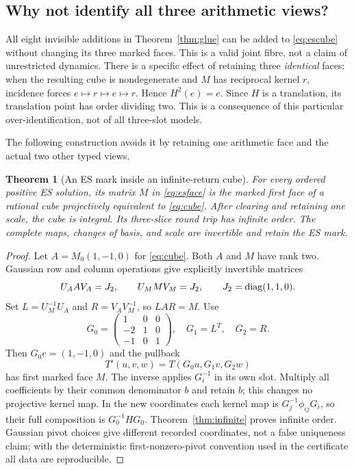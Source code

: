 \documentclass[11pt,reqno]{amsart}
\newtheorem{theorem}{Theorem}[section]
\theoremstyle{definition}\newtheorem{definition}[theorem]{Definition}
\theoremstyle{remark}\newtheorem{remark}[theorem]{Remark}
\begin{document}
\subsection{Why not identify all three arithmetic views?}
All eight invisible additions in Theorem~\ref{thm:glue} can be added to
\eqref{eq:escube} without changing its three marked faces. This is a valid
joint fibre, not a claim of unrestricted dynamics. There is a specific effect
of retaining three \emph{identical} faces: when the resulting cube is
nondegenerate and $M$ has reciprocal kernel $r$, incidence forces
$e\mapsto r\mapsto e\mapsto r$. Hence $H^2(e)=e$. Since $H$ is a translation,
its translation point has order dividing two. This is a consequence of this
particular over-identification, not of all three-slot models.

The following construction avoids it by retaining one arithmetic face and the
actual two other typed views.

\begin{theorem}[An ES mark inside an infinite-return cube]\label{thm:attachment}
For every ordered positive ES solution, its matrix $M$ in \eqref{eq:esface}
is the marked first face of a rational cube projectively equivalent to
\eqref{eq:cube}. After clearing and retaining one scale, the cube is integral.
Its three-slice round trip has infinite order. The complete maps, changes of
basis, and scale are invertible and retain the ES mark.
\end{theorem}
\begin{proof}
Let $A=M_0(1,-1,0)$ for \eqref{eq:cube}. Both $A$ and $M$ have rank two.
Gaussian row and column operations give explicitly invertible matrices
\[
 U_AAV_A=J_2,\qquad U_MMV_M=J_2,\qquad J_2=\operatorname{diag}(1,1,0).
\]
Set $L=U_M^{-1}U_A$ and $R=V_AV_M^{-1}$, so $LAR=M$.
Use
\[
 G_0=\begin{pmatrix}1&0&0\\-2&1&0\\-1&0&1\end{pmatrix},
 \quad G_1=L^T,\quad G_2=R.
\]
Then $G_0e=(1,-1,0)$ and the pullback
\[
 T'(u,v,w)=T(G_0u,G_1v,G_2w)
\]
has first marked face $M$. The inverse applies $G_i^{-1}$ in its own slot.
Multiply all coefficients by their common denominator $b$ and retain $b$;
this changes no projective kernel map. In the new coordinates each kernel
map is $G_j^{-1}\phi_{ij}G_i$, so their full composition is $G_0^{-1}HG_0$.
Theorem~\ref{thm:infinite} proves infinite order. Gaussian pivot choices give
different recorded coordinates, not a false uniqueness claim; with the
deterministic first-nonzero-pivot convention used in the certificate all data
are reproducible.
\end{proof}
\end{document}
